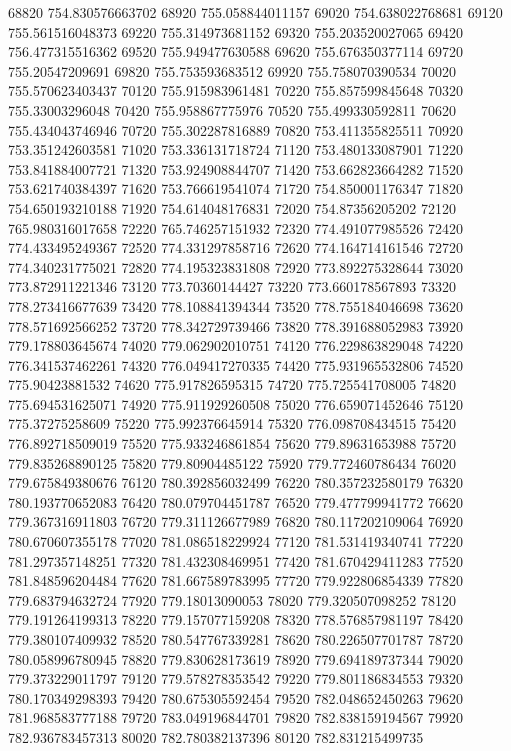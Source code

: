 {68820 754.830576663702
68920 755.058844011157
69020 754.638022768681
69120 755.561516048373
69220 755.314973681152
69320 755.203520027065
69420 756.477315516362
69520 755.949477630588
69620 755.676350377114
69720 755.20547209691
69820 755.753593683512
69920 755.758070390534
70020 755.570623403437
70120 755.915983961481
70220 755.857599845648
70320 755.33003296048
70420 755.958867775976
70520 755.499330592811
70620 755.434043746946
70720 755.302287816889
70820 753.411355825511
70920 753.351242603581
71020 753.336131718724
71120 753.480133087901
71220 753.841884007721
71320 753.924908844707
71420 753.662823664282
71520 753.621740384397
71620 753.766619541074
71720 754.850001176347
71820 754.650193210188
71920 754.614048176831
72020 754.87356205202
72120 765.980316017658
72220 765.746257151932
72320 774.491077985526
72420 774.433495249367
72520 774.331297858716
72620 774.164714161546
72720 774.340231775021
72820 774.195323831808
72920 773.892275328644
73020 773.872911221346
73120 773.70360144427
73220 773.660178567893
73320 778.273416677639
73420 778.108841394344
73520 778.755184046698
73620 778.571692566252
73720 778.342729739466
73820 778.391688052983
73920 779.178803645674
74020 779.062902010751
74120 776.229863829048
74220 776.341537462261
74320 776.049417270335
74420 775.931965532806
74520 775.90423881532
74620 775.917826595315
74720 775.725541708005
74820 775.694531625071
74920 775.911929260508
75020 776.659071452646
75120 775.37275258609
75220 775.992376645914
75320 776.098708434515
75420 776.892718509019
75520 775.933246861854
75620 779.89631653988
75720 779.835268890125
75820 779.80904485122
75920 779.772460786434
76020 779.675849380676
76120 780.392856032499
76220 780.357232580179
76320 780.193770652083
76420 780.079704451787
76520 779.477799941772
76620 779.367316911803
76720 779.311126677989
76820 780.117202109064
76920 780.670607355178
77020 781.086518229924
77120 781.531419340741
77220 781.297357148251
77320 781.432308469951
77420 781.670429411283
77520 781.848596204484
77620 781.667589783995
77720 779.922806854339
77820 779.683794632724
77920 779.18013090053
78020 779.320507098252
78120 779.191264199313
78220 779.157077159208
78320 778.576857981197
78420 779.380107409932
78520 780.547767339281
78620 780.226507701787
78720 780.058996780945
78820 779.830628173619
78920 779.694189737344
79020 779.373229011797
79120 779.578278353542
79220 779.801186834553
79320 780.170349298393
79420 780.675305592454
79520 782.048652450263
79620 781.968583777188
79720 783.049196844701
79820 782.838159194567
79920 782.936783457313
80020 782.780382137396
80120 782.831215499735
}
